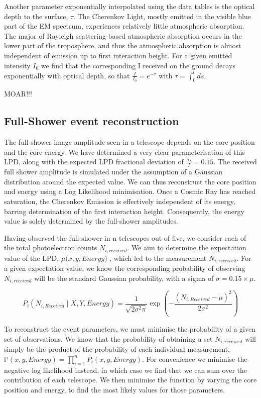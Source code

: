 \documentclass[11pt]{article}
\begin{document}
Another parameter exponentially interpolated using the data tables is the optical depth to the surface, $\tau$. The Cherenkov Light, mostly emitted in the visible blue part of the EM spectrum, experiences relatively little atmospheric absorption. The major of Rayleigh scattering-based atmospheric absorption occurs in the lower part of the troposphere, and thus the atmospheric absorption is almost independent of emission up to first interaction height. For a given emitted intensity $I_{0}$ we find that the corresponding I received on the ground decays exponentially with optical depth, so that $\frac{I}{I_{0}}=e^{-\tau}$ with $\tau=\int_{0}^{l}ds$. 

MOAR!!!

\subsection{Full-Shower event reconstruction}
The full shower image amplitude seen in a telescope depends on the core position and the core energy. We have determined a very clear parameterisation of this LPD, along with the expected LPD fractional deviation of $\frac{\sigma_{I}}{I}= 0.15$. The received full shower amplitude is simulated under the assumption of a Gaussian distribution around the expected value. We can thus reconstruct the core position and energy using a Log Likelihood minimisation. Once a Cosmic Ray has reached saturation, the Cherenkov Emission is effectively independent of its energy, barring determination of the first interaction height. Consequently, the energy value is solely determined by the full-shower amplitudes. 

Having observed the full shower in n telescopes out of five, we consider each of the total photoelectron counts $N_{i, received}$. We aim to determine the expectation value of the LPD, $\mu(x, y, Energy$) , which led to the measurement $N_{i, received}$. For a given expectation value, we know the corresponding probability of observing $N_{i, received}$ will be the standard Gaussian probability, with a sigma of $\sigma = 0.15 \times \mu$.

\[  P_{i} ( N_{i, Received} \mid X, Y, Energy )  =  \frac{1}{\sqrt{2 \sigma^{2} \pi}} \exp(-\frac{(N_{i, Received} - \mu)^{2}}{2 \sigma^{2}}) \]

To reconstruct the event parameters, we must minimise the probability of a given set of observations. We know that the probability of obtaining a set $N_{i,received}$ will simply be the product of the probability of each individual measurement, $\mathbb{P}(x, y, Energy) = \prod_{i=1}^{n} P_{i}(x, y, Energy)$. For convenience we minimise the negative log likelihood instead, in which case we find that we can sum over the contribution of each telescope. We then minimise the function by varying the core position and energy, to find the most likely values for those parameters.
\end{document}

